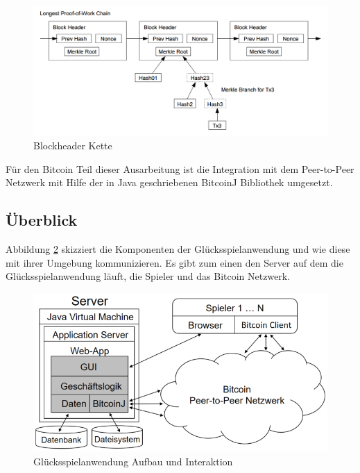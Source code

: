 \begin{figure}[H]
\centering
\includegraphics[width=1\linewidth]{Figures/umsetzung_btc/spv_chain}
\decoRule
\caption{Blockheader Kette}
\label{fig:spv_chain}
\end{figure}

Für den Bitcoin Teil dieser Ausarbeitung ist die Integration mit dem Peer-to-Peer Netzwerk mit Hilfe der in Java geschriebenen BitcoinJ\cite{bitcoinj} Bibliothek umgesetzt.

\subsection{Überblick}

Abbildung \ref{fig:anwendung_aufbau} skizziert die Komponenten der Glücksspielanwendung und wie diese mit ihrer Umgebung kommunizieren. Es gibt zum einen den Server auf dem die Glücksspielanwendung läuft, die Spieler und das Bitcoin Netzwerk.

\begin{figure}[H]
\centering
\includegraphics[width=1\linewidth]{Figures/umsetzung_btc/anwendung_aufbau}
\decoRule
\caption{Glücksspielanwendung Aufbau und Interaktion}
\label{fig:anwendung_aufbau}
\end{figure}

